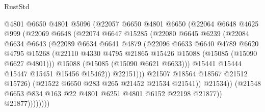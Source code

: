 \begin{lexlean}{RustStd}
\begin{coremodule}
                          @4801
                          @6650
                          @4801
                          @5096
                          (@22057
                            @6650
                            @4801
                            @6650
                            (@22064
                              @6648
                              @4625
                              @999
                              (@22069
                                @6648
                                (@22074
                                  @6647
                                  @15285
                                  (@22080
                                    @6645
                                    @6239
                                    (@22084
                                      @6634
                                      @6643
                                      (@22089
                                        @6634
                                        @6641
                                        @4879
                                        (@22096
                                          @6633
                                          @6640
                                          @4789
                                          @6620
                                          @4795
                                          @15268
                                          (@22110
                                            @4330
                                            @4795
                                            @21865
                                            @15426
                                            @15088
                                            (@15085 (@15090 @6627 @4801)))
                                          @15088
                                          (@15085 (@15090 @6621 @6633)))
                                        @15441
                                        @15444
                                        @15447
                                        @15451
                                        @15456
                                        @15462))
                                    @22151)))
                              @21507
                              @18564
                              @18567
                              @21512
                              @15726)
                            (@21522 @6650 @283 @265 @21452 @21534 @21541))
                          @21534))
                      (@21548 @6653 @834 @163 @22 @4801 @6251 @4801 @6152 @22198 @21877))
                    @21877))))))))

\end{coremodule}
\end{lexlean}
